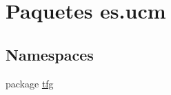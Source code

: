 \hypertarget{namespacees_1_1ucm}{\section{Paquetes es.\-ucm}
\label{namespacees_1_1ucm}
}
\subsection*{Namespaces}
\begin{DoxyCompactItemize}
\item 
package \hyperlink{namespacees_1_1ucm_1_1tfg}{tfg}
\end{DoxyCompactItemize}
